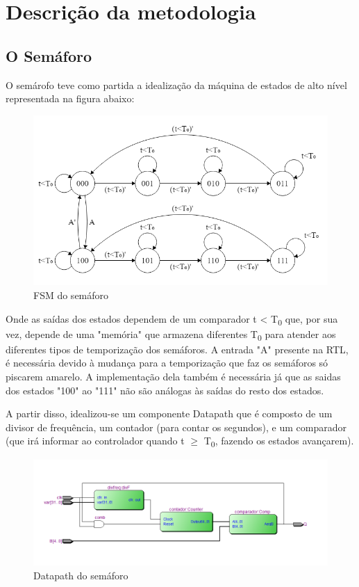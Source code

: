 \section{Descrição da metodologia}
\subsection{O Semáforo}
\setlength{\parindent}{2cm}
O semárofo teve como partida a idealização da máquina de estados de alto nível representada na figura abaixo: 
\begin{figure}
\caption{FSM do semáforo}
\centering
\includegraphics[width=0.75\columnwidth]{fsmsemaforo.png}
\end{figure}
Onde as saídas dos estados dependem de um comparador t < T\textsubscript{0} que, por sua vez, depende de uma "memória" que armazena diferentes T\textsubscript{0} para atender aos diferentes tipos de temporização dos semáforos. A entrada "A" presente na RTL, é necessária devido à mudança para a temporização que faz os semáforos só piscarem amarelo. A implementação dela também é necessária já que as saidas dos estados "100" ao "111" não são análogas às saídas do resto dos estados.

A partir disso, idealizou-se um componente Datapath que é composto de um divisor de frequência, um contador (para contar os segundos), e um comparador (que irá informar ao controlador quando t $\geq$ T\textsubscript{0}, fazendo os estados avançarem).
\begin{figure}
\caption{Datapath do semáforo}
\centering
\includegraphics[width=0.75\columnwidth]{datapath.png}
\end{figure}

